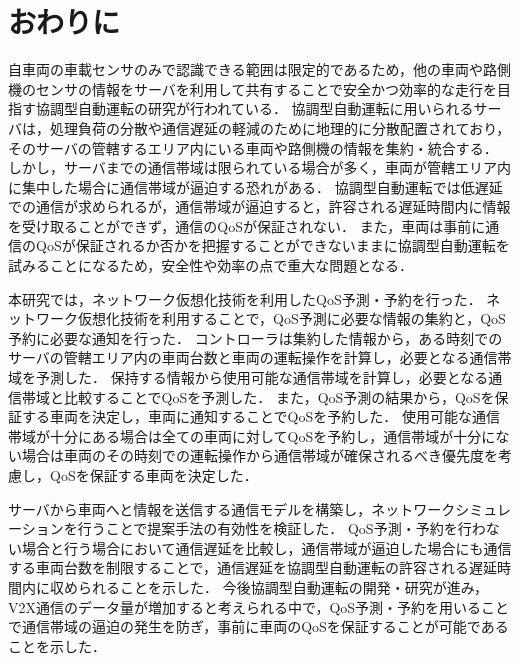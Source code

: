 \documentclass[a4paper,11pt,uplatex]{ujreport}
\begin{document}
\chapter{おわりに}
\label{chap:おわりに}


  自車両の車載センサのみで認識できる範囲は限定的であるため，他の車両や路側機のセンサの情報をサーバを利用して共有することで安全かつ効率的な走行を目指す協調型自動運転の研究が行われている．
  協調型自動運転に用いられるサーバは，処理負荷の分散や通信遅延の軽減のために地理的に分散配置されており，そのサーバの管轄するエリア内にいる車両や路側機の情報を集約・統合する．
  しかし，サーバまでの通信帯域は限られている場合が多く，車両が管轄エリア内に集中した場合に通信帯域が逼迫する恐れがある．
  協調型自動運転では低遅延での通信が求められるが，通信帯域が逼迫すると，許容される遅延時間内に情報を受け取ることができず，通信のQoSが保証されない．
  また，車両は事前に通信のQoSが保証されるか否かを把握することができないままに協調型自動運転を試みることになるため，安全性や効率の点で重大な問題となる．\par
  本研究では，ネットワーク仮想化技術を利用したQoS予測・予約を行った．
  ネットワーク仮想化技術を利用することで，QoS予測に必要な情報の集約と，QoS予約に必要な通知を行った．
  コントローラは集約した情報から，ある時刻でのサーバの管轄エリア内の車両台数と車両の運転操作を計算し，必要となる通信帯域を予測した．
  保持する情報から使用可能な通信帯域を計算し，必要となる通信帯域と比較することでQoSを予測した．
  また，QoS予測の結果から，QoSを保証する車両を決定し，車両に通知することでQoSを予約した．
  使用可能な通信帯域が十分にある場合は全ての車両に対してQoSを予約し，通信帯域が十分にない場合は車両のその時刻での運転操作から通信帯域が確保されるべき優先度を考慮し，QoSを保証する車両を決定した．\par
  サーバから車両へと情報を送信する通信モデルを構築し，ネットワークシミュレーションを行うことで提案手法の有効性を検証した．
  QoS予測・予約を行わない場合と行う場合において通信遅延を比較し，通信帯域が逼迫した場合にも通信する車両台数を制限することで，通信遅延を協調型自動運転の許容される遅延時間内に収められることを示した．
  今後協調型自動運転の開発・研究が進み，V2X通信のデータ量が増加すると考えられる中で，QoS予測・予約を用いることで通信帯域の逼迫の発生を防ぎ，事前に車両のQoSを保証することが可能であることを示した．
\end{document}
